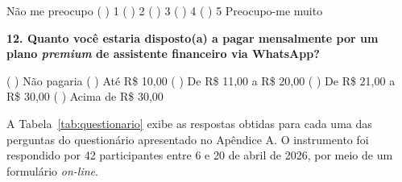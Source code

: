 \vspace{4pt}
Não me preocupo \quad ( ) 1 \quad ( ) 2 \quad ( ) 3 \quad ( ) 4 \quad ( ) 5 \quad Preocupo-me muito

\vspace{10pt}

\textbf{12. Quanto você estaria disposto(a) a pagar mensalmente por um plano \textit{premium} de assistente financeiro via WhatsApp?}

\vspace{4pt}
( ) Não pagaria \quad ( ) Até R\$ 10,00 \quad ( ) De R\$ 11,00 a R\$ 20,00 \quad ( ) De R\$ 21,00 a R\$ 30,00 \quad ( ) Acima de R\$ 30,00

\newpage


A Tabela~\ref{tab:questionario} exibe as respostas obtidas para cada uma das perguntas do questionário apresentado no Apêndice A. O instrumento foi respondido por 42 participantes entre 6 e 20 de abril de 2026, por meio de um formulário \textit{on-line}.

